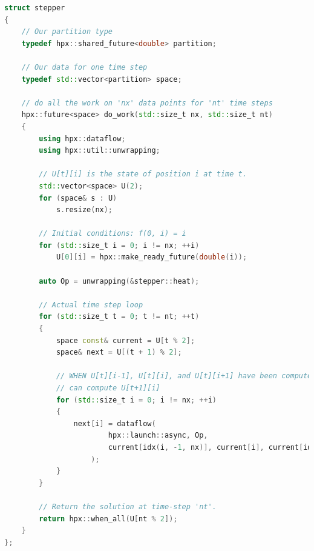 \documentclass[11pt,fleqn]{book} %
\begin{document}
\begin{lstlisting}[language=c++,caption={Futurized version of the one-dimensional heat equation.\label{code:hpx:future:ready}},float,floatplacement=tb]
struct stepper
{
    // Our partition type
    typedef hpx::shared_future<double> partition;

    // Our data for one time step
    typedef std::vector<partition> space;

    // do all the work on 'nx' data points for 'nt' time steps
    hpx::future<space> do_work(std::size_t nx, std::size_t nt)
    {
        using hpx::dataflow;
        using hpx::util::unwrapping;

        // U[t][i] is the state of position i at time t.
        std::vector<space> U(2);
        for (space& s : U)
            s.resize(nx);

        // Initial conditions: f(0, i) = i
        for (std::size_t i = 0; i != nx; ++i)
            U[0][i] = hpx::make_ready_future(double(i));

        auto Op = unwrapping(&stepper::heat);

        // Actual time step loop
        for (std::size_t t = 0; t != nt; ++t)
        {
            space const& current = U[t % 2];
            space& next = U[(t + 1) % 2];

            // WHEN U[t][i-1], U[t][i], and U[t][i+1] have been computed, THEN we
            // can compute U[t+1][i]
            for (std::size_t i = 0; i != nx; ++i)
            {
                next[i] = dataflow(
                        hpx::launch::async, Op,
                        current[idx(i, -1, nx)], current[i], current[idx(i, +1, nx)]
                    );
            }
        }

        // Return the solution at time-step 'nt'.
        return hpx::when_all(U[nt % 2]);
    }
};
\end{lstlisting}
\end{document}
